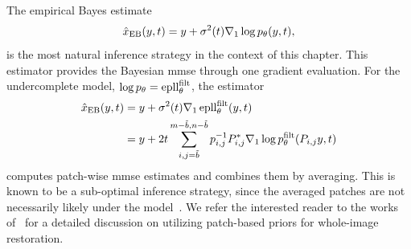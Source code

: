 The empirical Bayes estimate
\begin{equation}
	\hat{x}_{\mathrm{EB}}(y, t) = y + \sigma^{\num{2}}(t) \nabla_{\num{1}} \log p_\theta(y, t),
\end{equation}
is the most natural inference strategy in the context of this chapter.
This estimator provides the Bayesian \gls{mmse} through one gradient evaluation.
For the undercomplete model, \( \log p_\theta = \operatorname{epll}_\theta^{\mathrm{filt}} \), the estimator
\begin{equation}
	\begin{aligned}
		\hat{x}_{\mathrm{EB}}(y, t) &= y + \sigma^{\num{2}}(t) \nabla_{\num{1}} \operatorname{epll}_\theta^{\mathrm{filt}}(y, t) \\
									&= y + \num{2}t \sum_{i,j=\tilde{b}}^{m-\tilde{b},n-\tilde{b}} p_{i,j}^{-1} P_{i,j}^{\ast} \nabla_{\num{1}} \log p^{\mathrm{filt}}_\theta(P_{i,j} y, t)
	\end{aligned}
	\label{eq:ebpa}
\end{equation}
computes patch-wise \gls{mmse} estimates and combines them by averaging.
This is known to be a sub-optimal inference strategy, since the averaged patches are not necessarily likely under the model~\cite{zoran_learning_2011}.
We refer the interested reader to the works of~\cite{romano_boosting_2017,zoran_learning_2011} for a detailed discussion on utilizing patch-based priors for whole-image restoration.

